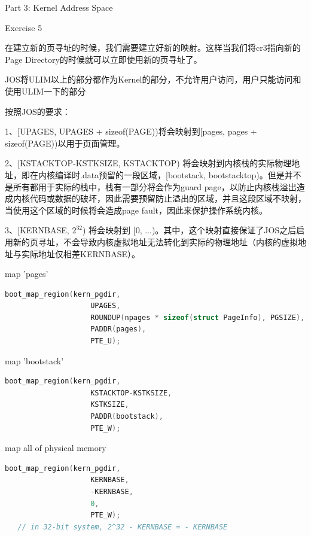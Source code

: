 \documentclass[GBK,winfonts,a4paper,10pt]{ctexart}
\begin{document}
\begin{section}{Part 3: Kernel Address Space}
\begin{subsection}{Exercise 5}
\par
在建立新的页寻址的时候，我们需要建立好新的映射。这样当我们将cr3指向新的Page Directory的时候就可以立即使用新的页寻址了。
\par
JOS将ULIM以上的部分都作为Kernel的部分，不允许用户访问，用户只能访问和使用ULIM一下的部分\par
按照JOS的要求：\par
1、[UPAGES, UPAGES + sizeof(PAGE))将会映射到[pages, pages + sizeof(PAGE))以用于页面管理。 \par
2、[KSTACKTOP-KSTKSIZE, KSTACKTOP) 将会映射到内核栈的实际物理地址，即在内核编译时.data预留的一段区域，[bootstack, bootstacktop)。但是并不是所有都用于实际的栈中，栈有一部分将会作为guard page，以防止内核栈溢出造成内核代码或数据的破坏，因此需要预留防止溢出的区域，并且这段区域不映射，当使用这个区域的时候将会造成page fault，因此来保护操作系统内核。\par
3、[KERNBASE, $2^{32}$) 将会映射到 [0, ...)。其中，这个映射直接保证了JOS之后启用新的页寻址，不会导致内核虚拟地址无法转化到实际的物理地址（内核的虚拟地址与实际地址仅相差KERNBASE）。\par

\begin{subsubsection}{map 'pages'}
\begin{lstlisting}[language=C]
    boot_map_region(kern_pgdir, 
                    UPAGES, 
                    ROUNDUP(npages * sizeof(struct PageInfo), PGSIZE), 
                    PADDR(pages),
                    PTE_U);
\end{lstlisting}
\end{subsubsection}

\begin{subsubsection}{map 'bootstack'}
\begin{lstlisting}[language=C]
	boot_map_region(kern_pgdir,
                    KSTACKTOP-KSTKSIZE,
                    KSTKSIZE,
                    PADDR(bootstack),
                    PTE_W);
\end{lstlisting}
\end{subsubsection}
\begin{subsubsection}{map all of physical memory}
\begin{lstlisting}[language=C]
	boot_map_region(kern_pgdir,
                    KERNBASE,
                    -KERNBASE,
                    0,
                    PTE_W); 
   // in 32-bit system, 2^32 - KERNBASE = - KERNBASE
\end{lstlisting}
\end{subsubsection}


\end{subsection}
\end{section}
\end{document}

